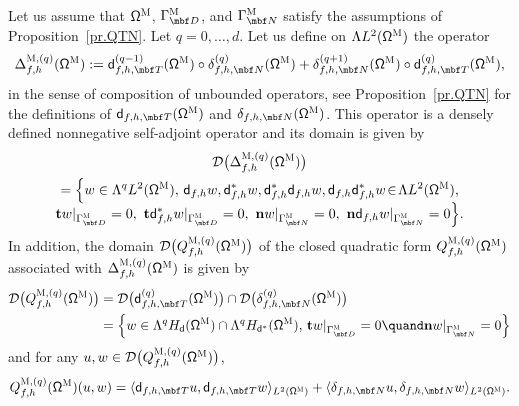 \begin{proposition}
\label{pr.DeltaM}
Let us assume that $\mathsf \Omega^{\textsc{M}}$, $\Gamma^{\textsc{M}}_{\mbf D}$, and $\Gamma^{\textsc{M}}_{\mbf N}$ satisfy the assumptions of Proposition~\ref{pr.QTN}. Let $q=0,\ldots,d$. Let us define on $ \Lambda L^{2} (\mathsf \Omega^{\textsc{M}})$ the operator
\begin{equation}
\label{eq.DeltaTN}
\Delta_{f,h}^{\textsc{M},(q)} (\mathsf \Omega^{\textsc{M}}):= \mathsf d_{f,h,\mbf T}^{(q-1)} (\mathsf \Omega^{\textsc{M}})\circ \delta_{f,h,\mbf N}^{(q)} (\mathsf \Omega^{\textsc{M}})+\delta_{f,h,\mbf N}^{(q+1)} (\mathsf \Omega^{\textsc{M}})\circ \mathsf d_{f,h,\mbf T}^{(q)} (\mathsf \Omega^{\textsc{M}}),
\end{equation}
in the sense of composition of unbounded operators, see Proposition~\ref{pr.QTN} for the definitions of $\mathsf d_{f,h,\mbf T} (\mathsf \Omega^{\textsc{M}})$ and $\delta_{f,h,\mbf N} (\mathsf \Omega^{\textsc{M}})$. This operator is a densely defined nonnegative self-adjoint operator
and its domain is given by
\begin{multline}
\label{eq.domDeltaTN}
\mathcal D\bigl(\Delta_{f,h}^{\textsc{M},(q)} (\mathsf \Omega^{\textsc{M}})\bigr)\\
=\Big\{w \in \Lambda^qL^{2}
(\mathsf \Omega^{\textsc{M}}), \,
\mathsf d_{f,h} w, \mathsf d^*_{f,h}w, \mathsf d^*_{f,h}\mathsf
d_{f,h} w, \mathsf d_{f,h}\mathsf d^*_{f,h} w \!
\in \! \Lambda L^{2} (\mathsf \Omega^{\textsc{M}}), \\[-5pt]
\mathbf{t}w|_{\Gamma^{\textsc{M}}_{\mbf D}}=0,\
\mathbf{t}\mathsf d^*_{f,h}w|_{\Gamma^{\textsc{M}}_{\mbf D}}=0,\
\mathbf{n}w|_{\Gamma^{\textsc{M}}_{\mbf N}}=0,\
\mathbf{n}\mathsf d_{f,h}w|_{\Gamma^{\textsc{M}}_{\mbf N}}=0
\Big\}.
\end{multline}
In addition, the domain $\mathcal D\bigl(Q_{f,h}^{\textsc{M},(q)} (\mathsf \Omega^{\textsc{M}}) \bigr)$ of the closed quadratic form $Q_{f,h}^{\textsc{M},(q)} (\mathsf \Omega^{\textsc{M}})$
associated with $\Delta_{f,h}^{\textsc{M},(q)} (\mathsf \Omega^{\textsc{M}})$
is given by
\begin{align*}
\mathcal D\bigl(Q^{\textsc{M},(q)}_{f,h} (\mathsf \Omega
^{\textsc{M}})\bigr)&= \mathcal D \bigl(\mathsf d_{f,h,\mbf T}^{(q)} (\mathsf \Omega^{\textsc{M}})\bigr)\cap
\mathcal D\bigl(\delta_{f,h,\mbf N}^{(q)} (\mathsf \Omega^{\textsc{M}})\bigr)\\
&=\left\{w\in \Lambda^qH_{\mathsf d}(\mathsf \Omega^{\textsc{M}})\cap \Lambda^qH_{\mathsf d^*}(\mathsf \Omega^{\textsc{M}}),\,
\mathbf t w|_{\Gamma^{\textsc{M}}_{\mbf D}}=0 \quand 
\mathbf n w|_{\Gamma^{\textsc{M}}_{\mbf N}}=0\right\}
\end{align*}
\label{page.qm}
and for any $u,w\in\mathcal D\bigl(Q^{\textsc{M},(q)}_{f,h} (\mathsf \Omega^{\textsc{M}})\bigr)$,
\[
Q_{f,h}^{\textsc{M},(q)} (\mathsf \Omega^{\textsc{M}})(u,w)=\langle \mathsf d_{f,h,\mbf T} u,\mathsf d_{f,h,\mbf T}w \rangle_{L^2(\mathsf \Omega^{\textsc{M}})} +\langle \delta_{f,h,\mbf N}u,\delta_{f,h,\mbf N}w \rangle_{L^2(\mathsf \Omega^{\textsc{M}})}.
\]
\end{proposition}

